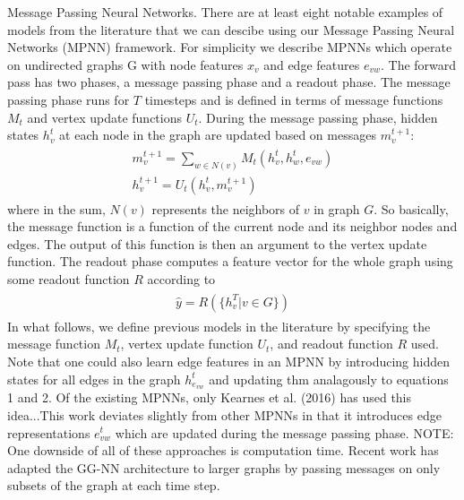 \documentclass[12pt,reqno]{amsart}
\numberwithin{equation}{section}
\begin{document}
\begin{enumerate}
\subitem Message Passing Neural Networks.  There are at least eight notable examples of models from the literature that we can descibe using our Message Passing Neural Networks (MPNN) framework.  For simplicity we describe MPNNs which operate on undirected graphs G with node features $x_v$ and edge features $e_{vw}$.  The forward pass has two phases, a message passing phase and a readout phase.  The message passing phase runs for $T$ timesteps and is defined in terms of message functions $M_t$ and vertex update functions $U_t$.  During the message passing phase, hidden states $h_v^t$ at each node in the graph are updated based on messages $m_{v}^{t + 1}$:
\begin{align}
\begin{split}
m_v^{t+1} = \sum_{w\in N(v)}M_t(h_v^t, h_w^t, e_{vw}) \\
h_v^{t+1} = U_t(h_v^t, m_v^{t+1})
\end{split}
\end{align}
where in the sum, $N(v)$ represents the neighbors of $v$ in graph $G$.  
So basically, the message function is a function of the current node and its neighbor nodes and edges.  The output of this function is then an argument to the vertex update function.  The readout phase computes a feature vector for the whole graph using some readout function $R$ according to 
\begin{align}
\begin{split}
\hat{y} = R(\{h_v^T | v\in G\})
\end{split}
\end{align}
In what follows, we define previous models in the literature by specifying the message function $M_t$, vertex update function $U_t$, and readout function $R$ used.  Note that one could also learn edge features in an MPNN by introducing hidden states for all edges in the graph $h_{e_{vw}}^t$ and updating thm analagously to equations 1 and 2.  Of the existing MPNNs, only Kearnes et al. (2016) has used this idea...This work deviates slightly from other MPNNs in that it introduces edge representations $e_{vw}^t$ which are updated during the message passing phase.  NOTE: One downside of all of these approaches is computation time.  Recent work has adapted the GG-NN architecture to larger graphs by passing messages on only subsets of the graph at each time step.     

\end{enumerate}
\end{document}
